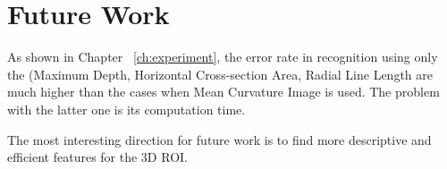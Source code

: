 \section{Future Work}

As shown in Chapter ~\ref{ch:experiment}, the error rate in recognition using only the (Maximum Depth, Horizontal Cross-section Area, Radial Line Length are much higher than the cases when Mean Curvature Image is used. The problem with the latter one is its computation time.

The most interesting direction for future work is to find more descriptive and efficient features for the 3D ROI.